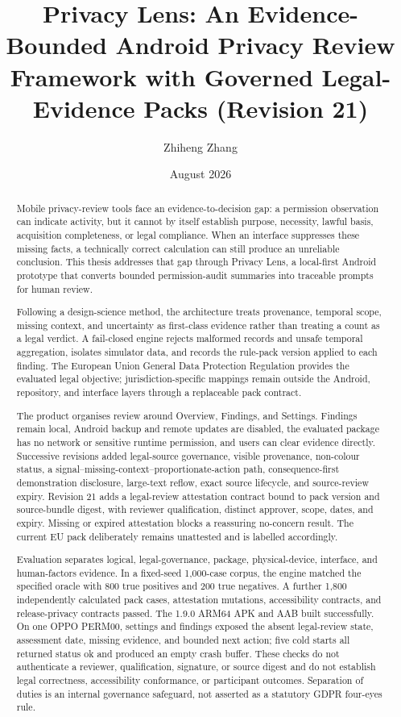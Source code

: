 \documentclass[11pt,a4paper]{article}
\title{Privacy Lens: An Evidence-Bounded Android Privacy Review Framework with Governed Legal-Evidence Packs (Revision 21)}
\author{Zhiheng Zhang}
\date{August 2026}
\begin{document}
\maketitle
\begin{abstract}
\small\singlespacing
Mobile privacy-review tools face an evidence-to-decision gap: a permission observation can indicate activity, but it cannot by itself establish purpose, necessity, lawful basis, acquisition completeness, or legal compliance. When an interface suppresses these missing facts, a technically correct calculation can still produce an unreliable conclusion. This thesis addresses that gap through Privacy Lens, a local-first Android prototype that converts bounded permission-audit summaries into traceable prompts for human review.

Following a design-science method, the architecture treats provenance, temporal scope, missing context, and uncertainty as first-class evidence rather than treating a count as a legal verdict. A fail-closed engine rejects malformed records and unsafe temporal aggregation, isolates simulator data, and records the rule-pack version applied to each finding. The European Union General Data Protection Regulation provides the evaluated legal objective; jurisdiction-specific mappings remain outside the Android, repository, and interface layers through a replaceable pack contract.

The product organises review around Overview, Findings, and Settings. Findings remain local, Android backup and remote updates are disabled, the evaluated package has no network or sensitive runtime permission, and users can clear evidence directly. Successive revisions added legal-source governance, visible provenance, non-colour status, a signal--missing-context--proportionate-action path, consequence-first demonstration disclosure, large-text reflow, exact source lifecycle, and source-review expiry. Revision 21 adds a legal-review attestation contract bound to pack version and source-bundle digest, with reviewer qualification, distinct approver, scope, dates, and expiry. Missing or expired attestation blocks a reassuring no-concern result. The current EU pack deliberately remains unattested and is labelled accordingly.

Evaluation separates logical, legal-governance, package, physical-device, interface, and human-factors evidence. In a fixed-seed 1,000-case corpus, the engine matched the specified oracle with 800 true positives and 200 true negatives. A further 1,800 independently calculated pack cases, attestation mutations, accessibility contracts, and release-privacy contracts passed. The 1.9.0 ARM64 APK and AAB built successfully. On one OPPO PERM00, settings and findings exposed the absent legal-review state, assessment date, missing evidence, and bounded next action; five cold starts all returned status ok and produced an empty crash buffer. These checks do not authenticate a reviewer, qualification, signature, or source digest and do not establish legal correctness, accessibility conformance, or participant outcomes. Separation of duties is an internal governance safeguard, not asserted as a statutory GDPR four-eyes rule.


\end{abstract}
\end{document}
